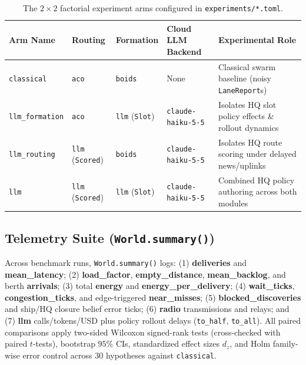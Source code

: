 \documentclass[11pt,a4paper,oneside]{report}
\begin{document}
\begin{table}[H]
\centering
\caption[Experimental arms across routing and formation engines]{The $2 \times 2$ factorial experiment arms configured in \texttt{experiments/*.toml}.}
\label{tab:exp-arms}
\begin{tabularx}{\textwidth}{@{}llll>{\raggedright\arraybackslash}X@{}}
\toprule
\textbf{Arm Name} & \textbf{Routing} & \textbf{Formation} & \textbf{Cloud LLM Backend} & \textbf{Experimental Role} \\
\midrule
\texttt{classical} & \texttt{aco} & \texttt{boids} & None & Classical swarm baseline (noisy \texttt{LaneReport}s) \\
\texttt{llm\_formation} & \texttt{aco} & \texttt{llm} (\texttt{Slot}) & \texttt{claude-haiku-5-5} & Isolates HQ slot policy effects \& rollout dynamics \\
\texttt{llm\_routing} & \texttt{llm} (\texttt{Scored}) & \texttt{boids} & \texttt{claude-haiku-5-5} & Isolates HQ route scoring under delayed news/uplinks \\
\texttt{llm} & \texttt{llm} (\texttt{Scored}) & \texttt{llm} (\texttt{Slot}) & \texttt{claude-haiku-5-5} & Combined HQ policy authoring across both modules \\
\bottomrule
\end{tabularx}
\end{table}

\subsection{Telemetry Suite (\texttt{World.summary()})}
Across benchmark runs, \texttt{World.summary()} logs: (1) \textbf{deliveries} and \textbf{mean\_latency}; (2) \textbf{load\_factor}, \textbf{empty\_distance}, \textbf{mean\_backlog}, and berth \textbf{arrivals}; (3) total \textbf{energy} and \textbf{energy\_per\_delivery}; (4) \textbf{wait\_ticks}, \textbf{congestion\_ticks}, and edge-triggered \textbf{near\_misses}; (5) \textbf{blocked\_discoveries} and ship/HQ closure belief error ticks; (6) \textbf{radio} transmissions and relays; and (7) \textbf{llm} calls/tokens/USD plus policy rollout delays (\texttt{to\_half}, \texttt{to\_all}). All paired comparisons apply two-sided Wilcoxon signed-rank tests (cross-checked with paired $t$-tests), bootstrap $95\%$ CIs, standardized effect sizes $d_z$, and Holm family-wise error control across $30$ hypotheses against \texttt{classical}.
\end{document}
